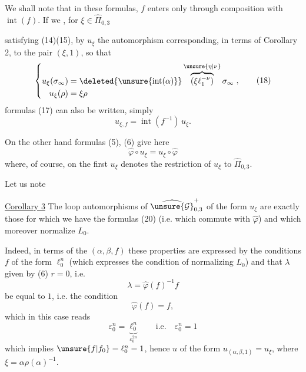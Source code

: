 We shall note that in these formulas, $f$ enters only through
composition with $\operatorname{int}(f)$. If we
, for $\xi\in\widehat\Pi_{0,3}$


satisfying (14)(15), by $u_\xi$ the automorphism
 corresponding, in terms of
Corollary 2, to the pair $(\xi,1)$, so that
\[
\left\{\begin{aligned}
u_\xi(\sigma_\infty)
 &=\deleted{\unsure{\operatorname{int}(\alpha)}}
 \overbrace{(\xi\ell_1^{-\nu})}^{\unsure{\eta|\nu}}\sigma_\infty\\
u_\xi(\rho)&=\xi\rho
\end{aligned}\right.,
\tag{18}
\]
formulas (17) can also be written, simply
\[
u_{\xi,f}=\operatorname{int}(f^{-1})\,u_\xi.
\tag{19}
\]

On the other hand formulas (5), (6) give here
\[
\widehat\varphi\circ u_\xi=u_\xi\circ\widehat\varphi
\tag{20}
\]
where, of course, on the first  $u_\xi$ denotes the
restriction of $u_\xi$ to $\widehat\Pi_{0,3}$.

Let us note

\uline{Corollary 3} The loop automorphisms of
$\widehat{\unsure{\mathcal G}}_{0,3}^{+}$ of the form $u_\xi$
 are exactly those for
which we have the  formulas (20) (i.e. which
 commute with $\widehat\varphi$) and which moreover
normalize $L_0$.


Indeed, in terms of the  $(\alpha,\beta,f)$  these properties are expressed by the  conditions  $f$ of the form $\ell_0^n$ (which expresses the condition of normalizing $L_0$) and that $\lambda$ given by (6)  $r=0$, i.e.
\[
\lambda=\widehat\varphi(f)^{-1}f
\tag{21}
\]
be equal to $1$, i.e. the condition
\[
\widehat\varphi(f)=f,
\tag{22}
\]
which in this case reads
\[
\varepsilon_0^n=\underbrace{\ell_0^n}_{\varepsilon_0^{2n}}
\qquad\text{i.e.}\quad \varepsilon_0^n=1
\]
which implies $\unsure{f|f_0}=\ell_0^n=1$, hence $u$ of the form $u_{(\alpha,\beta,1)}=u_\xi$, where $\xi=\alpha\rho(\alpha)^{-1}$.

